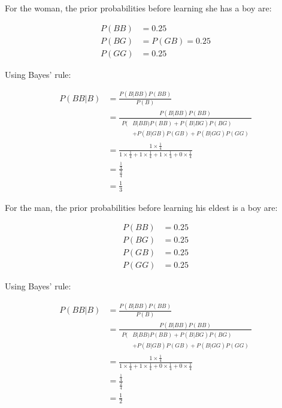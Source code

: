 \documentclass[
  letterpaper,
  DIV=11,
  numbers=noendperiod]{scrreprt}
\begin{document}
\begin{tcolorbox}[enhanced jigsaw, title=\textcolor{quarto-callout-tip-color}{\faLightbulb}\hspace{0.5em}{Answer}, toprule=.15mm, colback=white, breakable, titlerule=0mm, colframe=quarto-callout-tip-color-frame, coltitle=black, opacityback=0, rightrule=.15mm, colbacktitle=quarto-callout-tip-color!10!white, bottomtitle=1mm, opacitybacktitle=0.6, arc=.35mm, bottomrule=.15mm, toptitle=1mm, leftrule=.75mm, left=2mm]

For the woman, the prior probabilities before learning she has a boy
are:

\begin{align*}
P(BB)&=0.25 \\[6pt]
P(BG)&=P(GB)=0.25 \\[6pt]
P(GG)&=0.25
\end{align*}

Using Bayes' rule:

\begin{align*}
P(BB|B)&=\frac{P(B|BB)P(BB)}{P(B)} \\[12pt]
&=\frac{P(B|BB)P(BB)}{\begin{aligned}P(&B|BB)P(BB)+P(B|BG)P(BG)\\&+P(B|GB)P(GB)+P(B|GG)P(GG)\end{aligned}} \\[12pt]
&=\frac{1\times\frac{1}{4}}{1\times\frac{1}{4}+1\times\frac{1}{4}+1\times\frac{1}{4}+0\times\frac{1}{4}} \\[12pt]
&=\frac{\frac{1}{4}}{\frac{3}{4}} \\[12pt]
&=\frac{1}{3}
\end{align*}

For the man, the prior probabilities before learning his eldest is a boy
are:

\begin{align*}
P(BB)&=0.25 \\[6pt]
P(BG)&=0.25 \\[6pt]
P(GB)&=0.25 \\[6pt]
P(GG)&=0.25
\end{align*}

Using Bayes' rule:

\begin{align*}
P(BB|B)&=\frac{P(B|BB)P(BB)}{P(B)} \\[12pt]
&=\frac{P(B|BB)P(BB)}{\begin{aligned}P(&B|BB)P(BB)+P(B|BG)P(BG)\\&+P(B|GB)P(GB)+P(B|GG)P(GG)\end{aligned}} \\[12pt]
&=\frac{1\times\frac{1}{4}}{1\times\frac{1}{4}+1\times\frac{1}{4}+0\times\frac{1}{4}+0\times\frac{1}{4}} \\[12pt]
&=\frac{\frac{1}{4}}{\frac{2}{4}} \\[12pt]
&=\frac{1}{2}
\end{align*}


\end{tcolorbox}
\end{document}
